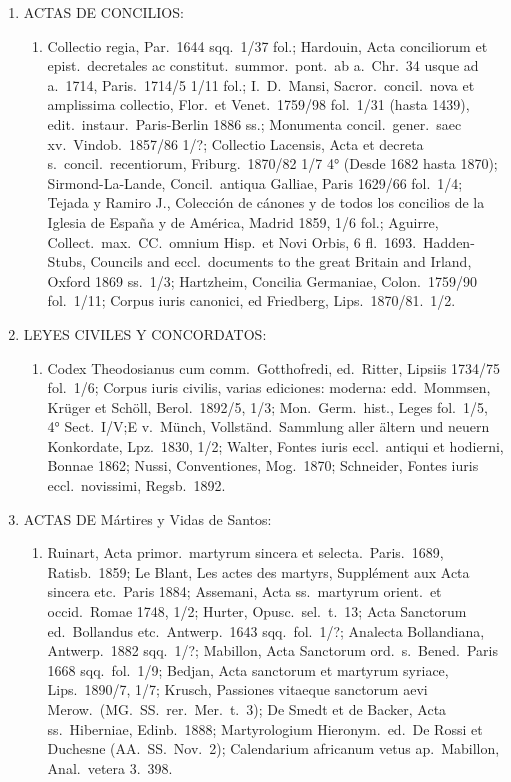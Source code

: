 \raggedbottom{} \documentclass[12pt, a4paper, openany]{book} %
\begin{document}
\begin{enumerate}
\begin{enumerate}
        \end{enumerate}
  \item ACTAS DE CONCILIOS:\@  \begin{enumerate}
          \item Collectio regia, Par.\ 1644 sqq.\ 1/37 fol.; Hardouin, Acta conciliorum et epist.\ decretales ac constitut.\ summor.\ pont.\ ab a.\ Chr.\ 34 usque ad a.\ 1714, Paris.\ 1714/5 1/11 fol.; I.\ D.\ Mansi, Sacror.\ concil.\ nova et amplissima collectio, Flor.\ et Venet.\ 1759/98 fol.\ 1/31 (hasta 1439), edit.\ instaur.\ Paris-Berlin 1886 ss.; Monumenta concil.\ gener.\ saec xv.\ Vindob.\ 1857/86 1/?; Collectio Lacensis, Acta et decreta s.\ concil.\ recentiorum, Friburg.\ 1870/82 1/7 4° (Desde 1682 hasta 1870); Sirmond-La-Lande, Concil.\ antiqua Galliae, Paris 1629/66 fol.\ 1/4; Tejada y Ramiro J., Colección de cánones y de todos los concilios de la Iglesia de España y de América, Madrid 1859, 1/6 fol.; Aguirre, Collect.\ max.\ CC.\ omnium Hisp.\ et Novi Orbis, 6 fl.\ 1693.\ Hadden-Stubs, Councils and eccl.\ documents to the great Britain and Irland, Oxford 1869 ss.\ 1/3; Hartzheim, Concilia Germaniae, Colon.\ 1759/90 fol.\ 1/11; Corpus iuris canonici, ed Friedberg, Lips.\ 1870/81.\ 1/2.
        \end{enumerate}
  \item LEYES CIVILES Y CONCORDATOS:\@  \begin{enumerate}
          \item Codex Theodosianus cum comm.\ Gotthofredi, ed.\ Ritter, Lipsiis 1734/75 fol.\ 1/6; Corpus iuris civilis, varias ediciones: moderna: edd.\ Mommsen, Krüger et Schöll, Berol.\ 1892/5, 1/3; Mon.\ Germ.\ hist., Leges fol.\ 1/5, 4° Sect.\ I/V;\@ E v.\ Münch, Vollständ.\ Sammlung aller ältern und neuern Konkordate, Lpz.\ 1830, 1/2; Walter, Fontes iuris eccl.\ antiqui et hodierni, Bonnae 1862; Nussi, Conventiones, Mog.\ 1870; Schneider, Fontes iuris eccl.\ novissimi, Regsb.\ 1892.
        \end{enumerate}
  \item ACTAS DE Mártires y Vidas de Santos:  \begin{enumerate}
          \item Ruinart, Acta primor.\ martyrum sincera et selecta.\ Paris.\ 1689, Ratisb.\ 1859; Le Blant, Les actes des martyrs, Supplément aux Acta sincera etc.\ Paris 1884; Assemani, Acta ss.\ martyrum orient.\ et occid.\ Romae 1748, 1/2; Hurter, Opusc.\ sel.\ t.\ 13; Acta Sanctorum ed.\ Bollandus etc.\ Antwerp.\ 1643 sqq.\ fol.\ 1/?; Analecta Bollandiana, Antwerp.\ 1882 sqq.\ 1/?; Mabillon, Acta Sanctorum ord.\ s.\ Bened.\ Paris 1668 sqq.\ fol.\ 1/9; Bedjan, Acta sanctorum et martyrum syriace, Lips.\ 1890/7, 1/7; Krusch, Passiones vitaeque sanctorum aevi Merow.\ (MG.\ SS.\ rer.\ Mer.\ t.\ 3); De Smedt et de Backer, Acta ss.\ Hiberniae, Edinb.\ 1888; Martyrologium Hieronym.\ ed.\ De Rossi et Duchesne (AA.\ SS.\ Nov.\ 2); Calendarium africanum vetus ap.\ Mabillon, Anal.\ vetera 3.\ 398.

\end{enumerate}
\end{enumerate}
\end{document}
